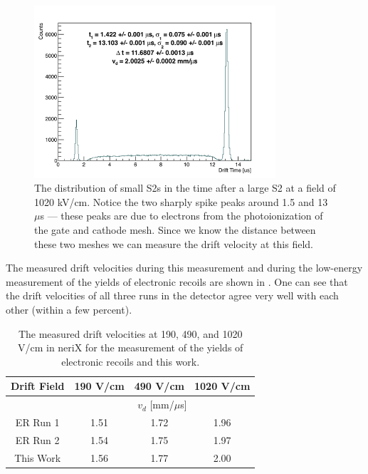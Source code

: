 \begin{figure}[t]
        \centering
	\includegraphics[width=0.8\textwidth]{nerix_drift_velocity}
	\caption{The distribution of small S2s in the time after a large S2 at a field of 1020 kV/cm.  Notice the two sharply spike peaks around 1.5 and 13 $\mu$s --- these peaks are due to electrons from the photoionization of the gate and cathode mesh.  Since we know the distance between these two meshes we can measure the drift velocity at this field.}
	\label{fig:nerix_drift_velocity}
\end{figure}


The measured drift velocities during this measurement and during the low-energy measurement of the yields of electronic recoils \cite{goetzke2016measurement} are shown in .  One can see that the drift velocities of all three runs in the detector agree very well with each other (within a few percent).

\begin{table}[b]
\centering
\def\arraystretch{1.3}
\begin{tabular}{cccc}
\hline
Drift Field & 190 V/cm & 490 V/cm & 1020 V/cm \\
\hline
 & \multicolumn{3}{c}{$v_d$ [mm/$\mu$s]} \\
\hline
ER Run 1 & 1.51 & 1.72 & 1.96 \\
ER Run 2 & 1.54 & 1.75 & 1.97 \\
This Work & 1.56 & 1.77 & 2.00 \\
\hline
\end{tabular}
\caption{The measured drift velocities at 190, 490, and 1020 V/cm in neriX for the measurement of the yields of electronic recoils \cite{goetzke2016measurement} and this work.}
\label{tab:nerix_drift_velocities}
\end{table}


